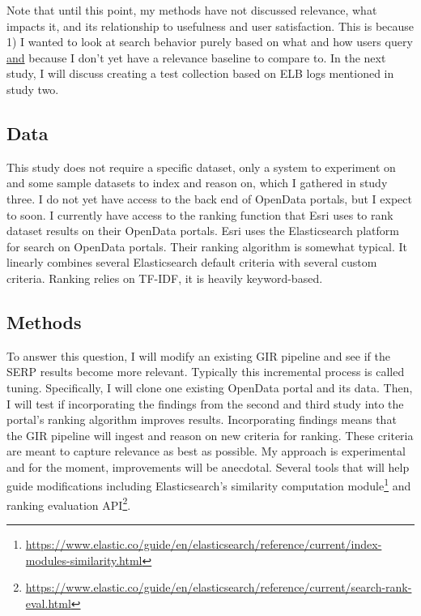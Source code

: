 Note that until this point, my methods have not discussed relevance, what impacts it, and its relationship to usefulness and user satisfaction. This is because 1) I wanted to look at search behavior purely based on what and how users query \underline{and} because I don't yet have a relevance baseline to compare to. In the next study, I will discuss creating a test collection based on ELB logs mentioned in study two.

\subsection{Data}
This study does not require a specific dataset, only a system to experiment on and some sample datasets to index and reason on, which I gathered in study three. I do not yet have access to the back end of OpenData portals, but I expect to soon. I currently have access to the ranking function that Esri uses to rank dataset results on their OpenData portals. Esri uses the Elasticsearch platform for search on OpenData portals. Their ranking algorithm is somewhat typical. It linearly combines several Elasticsearch default criteria with several custom criteria. Ranking relies on TF-IDF, it is heavily keyword-based. 

\subsection{Methods}

To answer this question, I will modify an existing GIR pipeline and see if the SERP results become more relevant. Typically this incremental process is called tuning. Specifically, I will clone one existing OpenData portal and its data. Then, I will test if incorporating the findings from the second and third study into the portal's ranking algorithm improves results. Incorporating findings means that the GIR pipeline will ingest and reason on new criteria for ranking. These criteria are meant to capture relevance as best as possible. My approach is experimental and for the moment, improvements will be anecdotal. Several tools that will help guide modifications including Elasticsearch's similarity computation module\footnote{\url{https://www.elastic.co/guide/en/elasticsearch/reference/current/index-modules-similarity.html}} and  ranking evaluation API\footnote{\url{https://www.elastic.co/guide/en/elasticsearch/reference/current/search-rank-eval.html}}.

